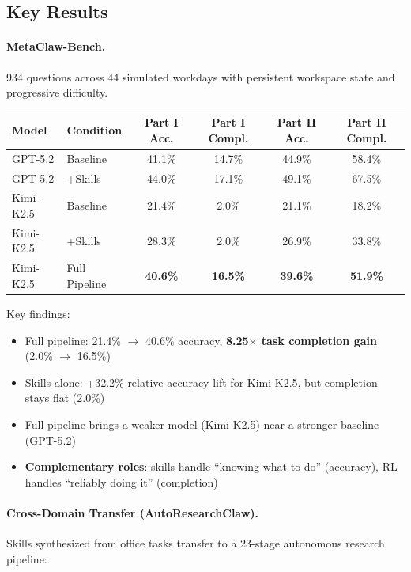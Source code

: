 \documentclass[11pt]{article}
\begin{document}
\subsection{Key Results}

\paragraph{MetaClaw-Bench.}
934 questions across 44 simulated workdays with persistent workspace state and progressive difficulty.

\begin{center}
\begin{tabular}{llcccc}
\toprule
\textbf{Model} & \textbf{Condition} & \textbf{Part I Acc.} & \textbf{Part I Compl.} & \textbf{Part II Acc.} & \textbf{Part II Compl.} \\
\midrule
GPT-5.2 & Baseline & 41.1\% & 14.7\% & 44.9\% & 58.4\% \\
GPT-5.2 & +Skills & 44.0\% & 17.1\% & 49.1\% & 67.5\% \\
\midrule
Kimi-K2.5 & Baseline & 21.4\% & 2.0\% & 21.1\% & 18.2\% \\
Kimi-K2.5 & +Skills & 28.3\% & 2.0\% & 26.9\% & 33.8\% \\
Kimi-K2.5 & Full Pipeline & \textbf{40.6\%} & \textbf{16.5\%} & \textbf{39.6\%} & \textbf{51.9\%} \\
\bottomrule
\end{tabular}
\end{center}

Key findings:
\begin{itemize}
    \item Full pipeline: 21.4\% $\rightarrow$ 40.6\% accuracy, \textbf{8.25$\times$ task completion gain} (2.0\% $\rightarrow$ 16.5\%)
    \item Skills alone: +32.2\% relative accuracy lift for Kimi-K2.5, but completion stays flat (2.0\%)
    \item Full pipeline brings a weaker model (Kimi-K2.5) near a stronger baseline (GPT-5.2)
    \item \textbf{Complementary roles}: skills handle ``knowing what to do'' (accuracy), RL handles ``reliably doing it'' (completion)
\end{itemize}

\paragraph{Cross-Domain Transfer (AutoResearchClaw).}
Skills synthesized from office tasks transfer to a 23-stage autonomous research pipeline:
\end{document}
